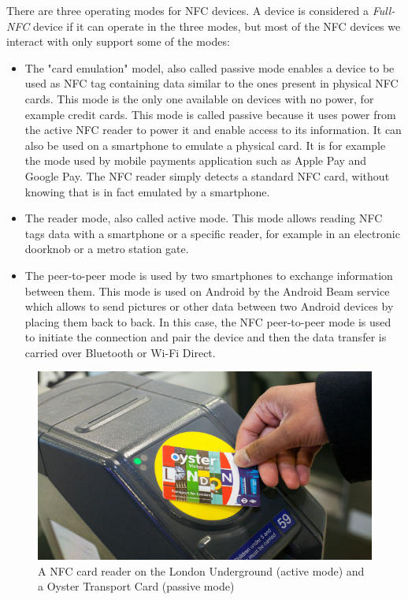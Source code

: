 \documentclass[11pt,a4paper]{report}
\begin{document}
There are three operating modes for NFC devices. A device is considered a \emph{Full-NFC} device if it can operate in the three modes, but most of the NFC devices we interact with only support some of the modes:
\begin{itemize}
	\item The "card emulation" model, also called passive mode enables a device to be used as NFC tag containing data similar to the ones present in physical NFC cards. This mode is the only one available on devices with no power, for example credit cards. This mode is called passive because it uses power from the active NFC reader to power it and enable access to its information. It can also be used on a smartphone to emulate a physical card. It is for example the mode used by mobile payments application such as Apple Pay and Google Pay. The NFC reader simply detects a standard NFC card, without knowing that is in fact emulated by a smartphone.
	\item The reader mode, also called active mode. This mode allows reading NFC tags data with a smartphone or a specific reader, for example in an electronic doorknob or a metro station gate.
	\item The peer-to-peer mode is used by two smartphones to exchange information between them. This mode is used on Android by the Android Beam service which allows to send pictures or other data between two Android devices by placing them back to back. In this case, the NFC peer-to-peer mode is used to initiate the connection and pair the device and then the data transfer is carried over Bluetooth or Wi-Fi Direct.
\end{itemize}
\begin{figure}[H]
\begin{center}
	\includegraphics[width=.6\textwidth]{assets/oyster_reader.jpg}
	\caption[NFC reader and Oyster Card]{A NFC card reader on the London Underground (active mode) and a Oyster Transport Card (passive mode) \cite{img:oyster}}
\end{center}
\end{figure}
\end{document}
